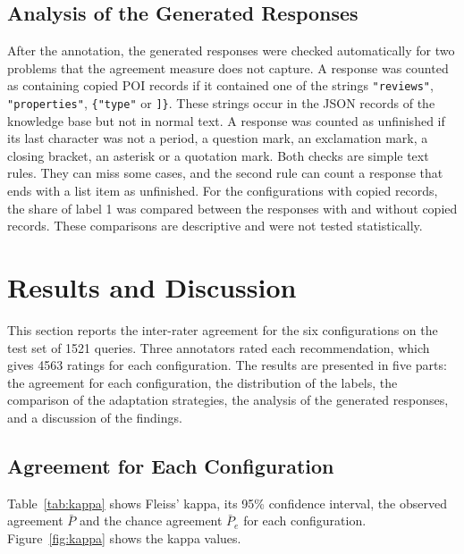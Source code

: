 \documentclass[journal,article,submit,pdftex,moreauthors]{Definitions/mdpi}
\begin{document}
\subsection{Analysis of the Generated Responses}\label{sec:output_method}
After the annotation, the generated responses were checked automatically for two problems that the agreement measure does not capture. A response was counted as containing copied POI records if it contained one of the strings \texttt{"reviews"}, \texttt{"properties"}, \texttt{\{"type"} or \texttt{]\}}. These strings occur in the JSON records of the knowledge base but not in normal text. A response was counted as unfinished if its last character was not a period, a question mark, an exclamation mark, a closing bracket, an asterisk or a quotation mark. Both checks are simple text rules. They can miss some cases, and the second rule can count a response that ends with a list item as unfinished. For the configurations with copied records, the share of label 1 was compared between the responses with and without copied records. These comparisons are descriptive and were not tested statistically.

\section{Results and Discussion}\label{sec:results}

This section reports the inter-rater agreement for the six configurations on the test set of 1521 queries. Three annotators rated each recommendation, which gives 4563 ratings for each configuration. The results are presented in five parts: the agreement for each configuration, the distribution of the labels, the comparison of the adaptation strategies, the analysis of the generated responses, and a discussion of the findings.

\subsection{Agreement for Each Configuration}
Table~\ref{tab:kappa} shows Fleiss' kappa, its 95\% confidence interval, the observed agreement $\bar{P}$ and the chance agreement $\bar{P}_e$ for each configuration. Figure~\ref{fig:kappa} shows the kappa values.
\end{document}
